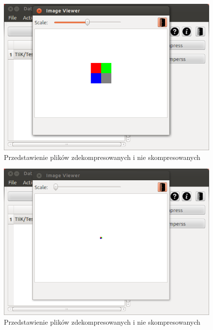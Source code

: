 \documentclass[12pt,a4paper,notitlepage]{report}
\begin{document}
\begin{figure}[H]
	\centering
	\includegraphics[scale=.7]{imageview_1}
	\caption{Przedstawienie plików zdekompresowanych i nie skompresowanych}
\end{figure}
\begin{figure}[H]
	\centering
	\includegraphics[scale=.7]{imageview_2}
	\caption{Przedstawienie plików zdekompresowanych i nie skompresowanych}
\end{figure}
\end{document}
